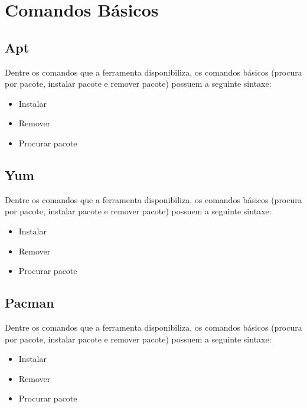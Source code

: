 \section{Comandos Básicos} %
\label{sec:comandos_b_sicos}


\subsection{Apt} %
\label{sub:apt}

Dentre os comandos que a ferramenta disponibiliza, os comandos básicos (procura por pacote, instalar pacote e remover pacote) possuem a seguinte sintaxe:

\begin{itemize}
	\item Instalar
	\item Remover
	\item Procurar pacote
\end{itemize}


\subsection{Yum} %
\label{sub:yum}

Dentre os comandos que a ferramenta disponibiliza, os comandos básicos (procura por pacote, instalar pacote e remover pacote) possuem a seguinte sintaxe:

\begin{itemize}
	\item Instalar
	\item Remover
	\item Procurar pacote
\end{itemize}



\subsection{Pacman} %
\label{sub:pacan}

Dentre os comandos que a ferramenta disponibiliza, os comandos básicos (procura por pacote, instalar pacote e remover pacote) possuem a seguinte sintaxe:

\begin{itemize}
	\item Instalar
	\item Remover
	\item Procurar pacote
\end{itemize}
